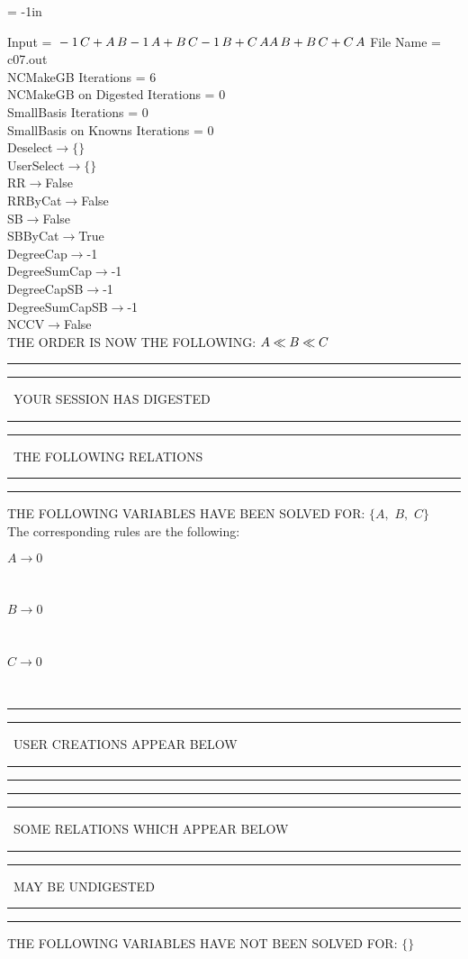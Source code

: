 \voffset = -1in
\evensidemargin 0.1in
\oddsidemargin 0.1in
\textheight 9in
\textwidth 6in

\normalsize
\baselineskip=12pt
\noindent
Input = 
$
\\-1\,
 C + A\,
 B\\
-1\,
 A + B\,
 C\\
-1\,
 B + C\,
 A\\
A\,
 B + B\,
 C + C\,
 A\\
$
File Name = c07.out\\
NCMakeGB Iterations = 6\\
NCMakeGB on Digested Iterations = 0\\
SmallBasis Iterations = 0\\
SmallBasis on Knowns Iterations = 0\\
Deselect$\rightarrow \{\}$\\
UserSelect$\rightarrow \{\}$\\
RR$\rightarrow $False\\
RRByCat$\rightarrow $False\\
SB$\rightarrow $False\\
SBByCat$\rightarrow $True\\
DegreeCap$\rightarrow $-1\\
DegreeSumCap$\rightarrow $-1\\
DegreeCapSB$\rightarrow $-1\\
DegreeSumCapSB$\rightarrow $-1\\
NCCV$\rightarrow $False\\
THE ORDER IS NOW THE FOLLOWING:\hfil\break
$
A\ll
B\ll
C\\
$
\rule[2pt]{6in}{4pt}\hfil\break
\rule[2pt]{1.879in}{4pt}
\ YOUR SESSION HAS DIGESTED\ 
\rule[2pt]{1.879in}{4pt}\hfil\break
\rule[2pt]{1.923in}{4pt}
\ THE FOLLOWING RELATIONS\ 
\rule[2pt]{1.923in}{4pt}\hfil\break
\rule[2pt]{6in}{4pt}\hfil\break
THE FOLLOWING VARIABLES HAVE BEEN SOLVED FOR:\hfil\break
$\{A,
$ $
B,
$ $
C\}$
\smallskip\\
The corresponding rules are the following:\smallskip\\
\begin{minipage}{6in}
$
A\rightarrow 0
$
\end{minipage}\medskip\\
\begin{minipage}{6in}
$
B\rightarrow 0
$
\end{minipage}\medskip\\
\begin{minipage}{6in}
$
C\rightarrow 0
$
\end{minipage}\medskip\\
\rule[2pt]{6in}{1pt}\hfil\break
\rule[2.5pt]{1.701in}{1pt}
\ USER CREATIONS APPEAR BELOW\ 
\rule[2.5pt]{1.701in}{1pt}\hfil\break
\rule[2pt]{6in}{1pt}\hfil\break
\rule[2pt]{6in}{4pt}\hfil\break
\rule[2pt]{1.45in}{4pt}
\ SOME RELATIONS WHICH APPEAR BELOW\ 
\rule[2pt]{1.45in}{4pt}\hfil\break
\rule[2pt]{2.18in}{4pt}
\ MAY BE UNDIGESTED\ 
\rule[2pt]{2.18in}{4pt}\hfil\break
\rule[2pt]{6in}{4pt}\hfil\break
THE FOLLOWING VARIABLES HAVE NOT BEEN SOLVED FOR:\hfil\break
$\{\}$
\smallskip\\
\vspace{10pt}

